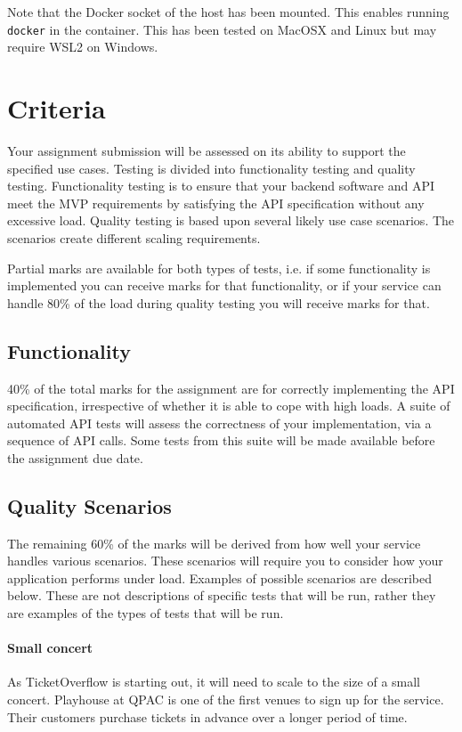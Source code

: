 \documentclass{csse4400}
\begin{document}
\noindent
Note that the Docker socket of the host has been mounted.
This enables running \texttt{docker} in the container.
This has been tested on MacOSX and Linux but may require WSL2 on Windows.


\section{Criteria}
Your assignment submission will be assessed on its ability to support the specified use cases.
Testing is divided into functionality testing and quality testing.
Functionality testing is to ensure that your backend software and API meet the MVP requirements by satisfying the API specification without any excessive load.
Quality testing is based upon several likely use case scenarios.
The scenarios create different scaling requirements.

Partial marks are available for both types of tests,
i.e. if some functionality is implemented you can receive marks for that functionality,
or if your service can handle 80\% of the load during quality testing you will receive marks for that.

\subsection{Functionality}
40\% of the total marks for the assignment are for correctly implementing the API specification,
irrespective of whether it is able to cope with high loads.
A suite of automated API tests will assess the correctness of your implementation, via a sequence of API calls.
Some tests from this suite will be made available before the assignment due date.

\subsection{Quality Scenarios}\label{sec:scenarios}
The remaining 60\% of the marks will be derived from how well your service handles various scenarios.
These scenarios will require you to consider how your application performs under load.
Examples of possible scenarios are described below.
These are not descriptions of specific tests that will be run,
rather they are examples of the types of tests that will be run.

\paragraph{Small concert}
As TicketOverflow is starting out,
it will need to scale to the size of a small concert.
Playhouse at QPAC is one of the first venues to sign up for the service.
Their customers purchase tickets in advance over a longer period of time.
\end{document}
